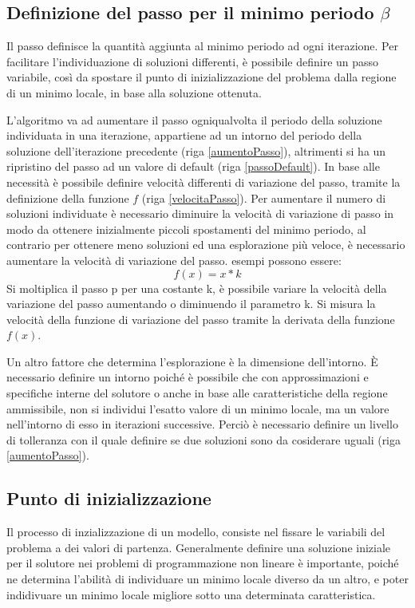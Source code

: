 \documentclass[a4paper,12pt]{report}
\begin{document}
\subsection{Definizione del passo per il minimo periodo $\beta$}
\label{ss:passo}
Il passo definisce la quantità aggiunta al minimo periodo ad ogni iterazione.
Per facilitare l'individuazione di soluzioni differenti, è possibile definire un passo variabile, così da spostare il punto di inizializzazione del problema dalla regione di un minimo locale, in base alla soluzione ottenuta.



L'algoritmo va ad aumentare il passo ogniqualvolta il periodo della soluzione individuata in una iterazione, appartiene ad un intorno del periodo della soluzione dell'iterazione precedente (riga \ref{aumentoPasso}), altrimenti si ha un ripristino del passo ad un valore di default (riga \ref{passoDefault}). In base alle necessità è possibile definire velocità differenti di variazione del passo, tramite la definizione della funzione $f$ (riga \ref{velocitaPasso}). Per aumentare il numero di soluzioni individuate è necessario diminuire la velocità di variazione di passo in modo da ottenere inizialmente piccoli spostamenti del minimo periodo, al contrario per ottenere meno soluzioni ed una esplorazione più veloce, è necessario aumentare la velocità di variazione del passo. esempi possono essere:
\begin{equation}
  \label{velocitaPassoEspl}
f(x) = x * k
\end{equation}
Si moltiplica il passo p per una costante k, è possibile variare la velocità della variazione del passo aumentando o diminuendo il parametro k. Si misura la velocità della funzione di variazione del passo tramite la derivata della funzione $f(x)$.

Un altro fattore che determina l'esplorazione è la dimensione dell'intorno. È necessario definire un intorno poiché è possibile che con approssimazioni e specifiche interne del solutore o anche in base alle caratteristiche della regione ammissibile, non si individui l'esatto valore di un minimo locale, ma un valore nell'intorno di esso in iterazioni successive. Perciò è necessario definire un livello di tolleranza con il quale definire se due soluzioni sono da cosiderare uguali (riga \ref{aumentoPasso}).

\subsection{Punto di inizializzazione}
Il processo di inzializzazione di un modello, consiste nel fissare le variabili del problema a dei valori di partenza. Generalmente definire una soluzione iniziale per il solutore nei problemi di programmazione non lineare è importante, poiché ne determina l'abilità di individuare un minimo locale diverso da un altro, e poter indidivuare un minimo locale migliore sotto una determinata caratteristica.
\end{document}
